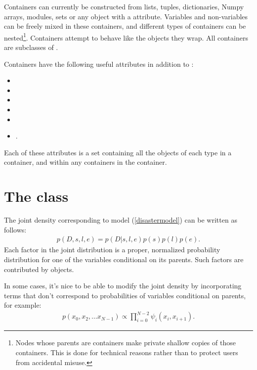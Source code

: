 Containers can currently be constructed from lists, tuples, dictionaries, Numpy arrays, modules, sets or any object with a  attribute. Variables and non-variables can be freely mixed in these containers, and different types of containers can be nested\footnote{Nodes whose parents are containers make private shallow copies of those containers. This is done for technical reasons rather than to protect users from accidental misuse.}. Containers attempt to behave like the objects they wrap. All containers are subclasses of . 

Containers have the following useful attributes in addition to :
\begin{itemize}
    \item{}
    \item{}
    \item{}
    \item{}
    \item{}
    \item{}.
\end{itemize}
Each of these attributes is a set containing all the objects of each type in a container, and within any containers in the container.


\hypertarget{potential}{}
\section[The Potential class]{The  class} \label{potential}


The joint density corresponding to model (\ref{disastermodel}) can be written as follows:
\begin{eqnarray*}
    p(D,s,l,e) = p(D|s,l,e) p(s) p(l) p(e).
\end{eqnarray*}
Each factor in the joint distribution is a proper, normalized probability distribution for one of the variables conditional on its parents. Such factors are contributed by  objects.

In some cases, it's nice to be able to modify the joint density by incorporating terms that don't correspond to probabilities of variables conditional on parents, for example:
\begin{eqnarray*}
    p(x_0, x_2, \ldots x_{N-1}) \propto \prod_{i=0}^{N-2} \psi_i(x_i, x_{i+1}).
\end{eqnarray*}


